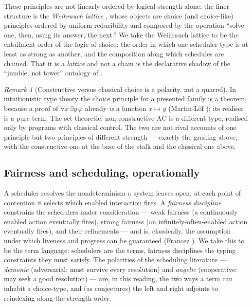 \documentclass[11pt]{article}
\theoremstyle{definition}
\theoremstyle{plain}
\theoremstyle{remark}
\newtheorem{remark}{Remark}
\newcommand{\AC}{\mathrm{AC}}
\begin{document}
\noindent
These principles are not linearly ordered by logical strength alone; the finer structure is the
\emph{Weihrauch lattice} \cite{weihrauch}, whose objects are choice (and choice-like) principles
ordered by uniform reducibility and composed by the operation ``solve one, then, using its answer,
the next.'' We take the Weihrauch lattice to be the entailment order of the logic of choice: the
order in which one scheduler-type is at least as strong as another, and the composition along which
schedules are chained. That it is a \emph{lattice} and not a chain is the declarative shadow of the
``jumble, not tower'' ontology of \cite{agency}.

\begin{remark}[Constructive versus classical choice is a polarity, not a quarrel]
In intuitionistic type theory the choice principle for a presented family is a theorem, because
a proof of $\forall x\,\exists y\,\varphi$ already \emph{is} a function $x \mapsto y$ (Martin-L\"of
\cite{martinlof}); its realiser is a pure term. The set-theoretic, non-constructive $\AC$ is a
different type, realised only by programs with classical control. The two are not rival accounts of
one principle but two principles of different strength --- exactly the grading above, with the
constructive one at the base of the stalk and the classical one above.
\end{remark}

\subsection{Fairness and scheduling, operationally}

A scheduler resolves the nondeterminism a system leaves open: at each point of contention it
selects which enabled interaction fires. A \emph{fairness discipline} constrains the schedulers
under consideration --- weak fairness (a continuously enabled action eventually fires), strong
fairness (an infinitely-often-enabled action eventually fires), and their refinements --- and is,
classically, the assumption under which liveness and progress can be guaranteed (Francez
\cite{francez}). We take this to be the term language: schedulers are the terms, fairness
disciplines the typing constraints they must satisfy. The polarities of the scheduling literature
--- \emph{demonic} (adversarial: must survive every resolution) and \emph{angelic} (cooperative:
may seek a good resolution) --- are, in this reading, the two ways a term can inhabit a choice-type,
and (as \cite{agency} conjectures) the left and right adjoints to reindexing along the strength
order.
\end{document}
